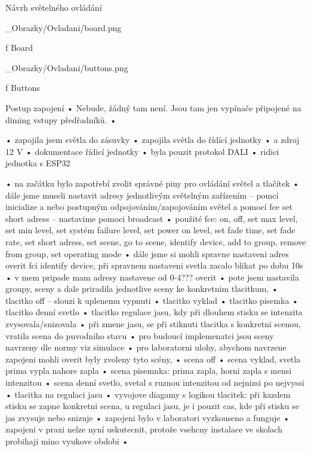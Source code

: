 \sec Návrh světelného ovládání

\medskip {}
\picw=10cm _Obrazky/Ovladani/board.png
\caption/f Board
\medskip

\medskip {}
\picw=15cm _Obrazky/Ovladani/buttons.png
\caption/f Buttons
\medskip





Postup zapojení
    • Nebude, žádný tam není. Jsou tam jen vypínače připojené na diming vstupy předřadníků.
    • 

    • zapojila jsem světla do zásuvky
    • zapojila světla do řídící jednotky
    • a zdroj 12 V
    • dokumentace řídicí jednotky
    • byla pouzit protokol DALI
    • ridici jednotka s ESP32

    • na začátku bylo zapotřebí zvolit správné piny pro ovládání světel a tlačítek
    • dále jsme museli nastavit adresy jednotlivým světelným zařízením – pomcí inicialize a nebo postupným odpojováním/zapojováním světel a pomocí fce set short adress – nastavime pomoci broadcast
    • použité fce: on, off, set max level, set min level, set systém failure level, set power on level, set fade time, set fade rate, set short adress, set scene, go to scene, identify device, add to group, remove from group, set operating mode
    • dále jsme si mohli spravne nastaveni adres overit fci identify device, při spravnem nastaveni svetla zacalo blikat po dobu 10s
    • v mem pripade mam adresy nastavene od 0-4??? overit
    • pote jsem nastavila groupy, sceny a dale priradila jednotlive sceny ke konkretnim tlacitkum,
    • tlacitko off – slouzi k uplenemu vypnuti
    • tlacitko vyklad
    • tlacitko pisemka
    • tlacitko denní svetlo
    • tlacitko regulace jasu, kdy při dlouhem stisku se intenzita zvysovala/snizovala
    • při zmene jasu, se při stiknuti tlacitka s konkretni scenou, vratila scena do puvodniho stavu
    • pro budoucí implemenatci jsou sceny navrzeny dle normy viz simulace
    • pro laboratorni ulohy, abychom navrzene zapojeni mohli overit byly zvoleny tyto scény,
    • scena off
    • scena vyklad, svetla prima vypla nahore zapla
    • scena pisemnka: prima zapla, horni zapla s mensi intenzitou
    • scena denní svetlo, svetal s ruznou intenzitou od nejnizsi po nejvyssi
    • tlacitka na regulaci jasu
    • vyvojove diagamy s logikou tlacitek: při kazdem stisku se zapne konkretni scena, u regulaci jasu, je i pouzit cas, kde při stisku se jas zvysuje nebo snizuje
    • zapojeni bylo v laboratori vyzkouseno a funguje
    • zapojeni v praxi nelze nyní uskutecnit, protože vsehcny instalace ve skolach probihaji mino vyukove obdobi
    • 



